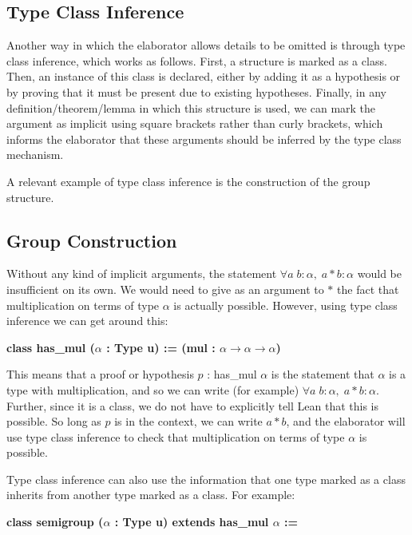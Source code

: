 \documentclass[runningheads,a4paper]{llncs}
\renewcommand{\a}{\alpha}
\renewcommand{\-}{\setminus}
\begin{document}
\subsection{Type Class Inference}

Another way in which the elaborator allows details to be omitted is through type class inference, which works as follows. First, a structure is marked as a class. Then, an instance of this class is declared, either by adding it as a hypothesis or by proving that it must be present due to existing hypotheses. Finally, in any definition/theorem/lemma in which this structure is used, we can mark the argument as implicit using square brackets rather than curly brackets, which informs the elaborator that these arguments should be inferred by the type class mechanism.

A relevant example of type class inference is the construction of the group structure.

\subsection{Group Construction}

Without any kind of implicit arguments, the statement $\forall a\; b : \a,\; a*b : \a$ would be insufficient on its own. We would need to give as an argument to $*$ the fact that multiplication on terms of type $\a$ is actually possible. However, using type class inference we can get around this:

\vspace{2 mm}
\hspace{4 em}\textbf{class has\_mul ($\a$ : Type u) := (mul : $\a \to \a \to \a$)}
\vspace{2 mm}

This means that a proof or hypothesis $p$ : has\_mul $\a$ is the statement that $\a$ is a type with multiplication, and so we can write (for example) $\forall a\; b : \a,\; a*b : \a$. Further, since it is a class, we do not have to explicitly tell Lean that this is possible. So long as $p$ is in the context, we can write $a * b$, and the elaborator will use type class inference to check that multiplication on terms of type $\a$ is possible.

Type class inference can also use the information that one type marked as a class inherits from another type marked as a class. For example:

\vspace{2 mm}
\hspace{4 em}\textbf{class semigroup ($\a$ : Type u) extends has\_mul $\a$
 := }
\end{document}

